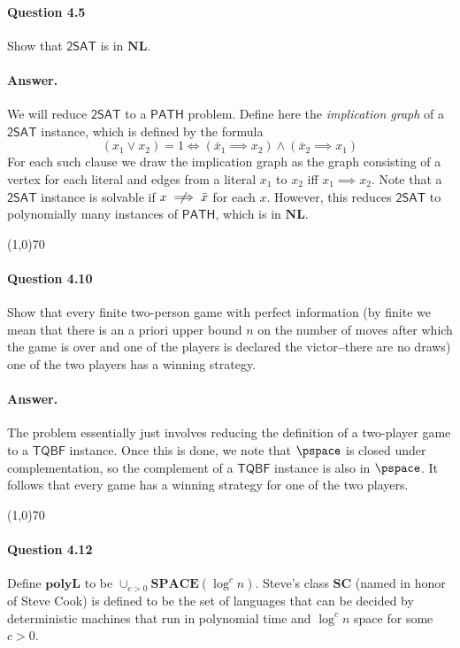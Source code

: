 \paragraph{Question 4.5} Show that $\mathsf{2SAT}$ is in $\mathbf{NL}$.

\paragraph{Answer.} We will reduce $\mathsf{2SAT}$ to a $\mathsf{PATH}$ problem. Define here the \textit{implication graph} of a $\mathsf{2SAT}$ instance, which is defined by the formula
$$(x_1\vee x_2)=1\iff (\bar{x}_1\implies x_2)\wedge(\bar{x}_2\implies x_1)$$
For each such clause we draw the implication graph as the graph consisting of a vertex for each literal and edges from a literal $x_1$ to $x_2$ iff $x_1\implies x_2$. Note that a $\mathsf{2SAT}$ instance is solvable if 
$x\centernot\implies \bar{x}$ for each $x$. However, this reduces $\mathsf{2SAT}$ to polynomially many instances of $\mathsf{PATH}$, which is in $\mathbf{NL}$.

\begin{center}
	\line(1,0){70}
\end{center}

\paragraph{Question 4.10} Show that every finite two-person game with perfect information (by finite we mean that there is an a priori upper bound $n$ on the number of moves after which the game is over and one of the players is declared the victor\textbf{--}there are no draws) one of the two players has a winning strategy.

\paragraph{Answer.} The problem essentially just involves reducing the definition of a two-player game to a $\mathsf{TQBF}$ instance. Once this is done, we note that $\pspace$ is closed under complementation, so the complement of a $\mathsf{TQBF}$ instance is also in $\pspace$. It follows that every game has a winning strategy for one of the two players.

\begin{center}
	\line(1,0){70}
\end{center}

\paragraph{Question 4.12} Define $\mathbf{polyL}$ to be $\cup_{c>0}\mathbf{SPACE}(\log^c n)$. Steve's class $\mathbf{SC}$ (named in honor of Steve Cook) is defined to be the set of languages that can be decided by deterministic machines that run in polynomial time and $\log^c n$ space for some $c>0$.

